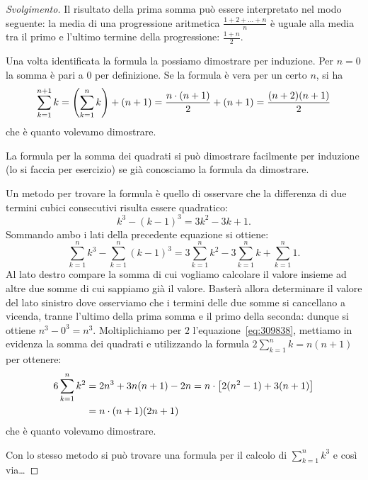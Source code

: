 \begin{proof}[Svolgimento]
Il risultato della prima somma può essere interpretato nel modo seguente:
la media di una progressione aritmetica $\frac{1+2+ \dots + n}{n}$ 
è uguale alla media tra il primo 
e l'ultimo termine della progressione: $\frac{1+n}{2}$.

Una volta identificata la formula la possiamo dimostrare per induzione.
Per $n=0$ la somma è pari a $0$ per definizione.
Se la formula è vera per un certo $n$, si ha 
\[
  \sum_{k=1}^{n+1} k = {\left( \sum_{k=1}^n k \right)} + (n+1)
   = \frac{n\cdot(n+1)}{2} + (n+1) 
   = \frac{(n+2)(n+1)}{2}
\]
che è quanto volevamo dimostrare.

La formula per la somma dei quadrati si può dimostrare facilmente per 
induzione (lo si faccia per esercizio) se già conosciamo la formula da 
dimostrare.

Un metodo per trovare la formula è quello di osservare che la differenza 
di due termini cubici consecutivi risulta essere quadratico:
\[
k^3 - (k-1)^3 = 3 k^2 - 3k + 1.  
\]
Sommando ambo i lati della precedente equazione si ottiene:
\begin{equation}\label{eq:309838}
\sum_{k=1}^n k^3 - \sum_{k=1}^n (k-1)^3 = 3\sum_{k=1}^n k^2-3\sum_{k=1}^n k+\sum_{k=1}^n 1.
\end{equation}
Al lato destro compare la somma di cui vogliamo calcolare il valore 
insieme ad altre due somme di cui sappiamo già il valore. 
Basterà allora determinare il valore del lato sinistro dove 
osserviamo che i termini delle due somme si cancellano 
a vicenda,
tranne l'ultimo della prima somma 
e il primo della seconda: dunque si ottiene $n^3 - 0^3=n^3$.
Moltiplichiamo per $2$ l'equazione~\eqref{eq:309838},
mettiamo in evidenza la somma dei quadrati e 
utilizzando la formula $2\sum_{k=1}^n k = n(n+1)$
per ottenere:
\begin{align*}
  6 \sum_{k=1}^n k^2 
  &=  2n^3 + 3 n(n+1) - 2n
  = n \cdot {\left[ 2(n^2-1) + 3(n+1) \right]}\\
  &= n \cdot (n+1)(2n+1)
\end{align*}
che è quanto volevamo dimostrare.

Con lo stesso metodo si può trovare una formula per il calcolo 
di $\sum_{k=1}^n k^3$ e così via\dots
\end{proof}

